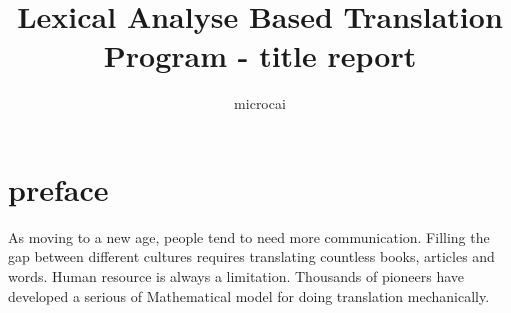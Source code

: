 \documentclass[a4paper]{article}
\title{Lexical Analyse Based Translation Program - title report}
\author{microcai}
\begin{document}
\part*{preface}

As moving to a new age, people tend to need more communication. Filling the gap between different cultures requires translating countless books, articles and words. Human resource is always a limitation. Thousands of 
pioneers have developed a serious of Mathematical model for doing translation mechanically. 
\end{document}
